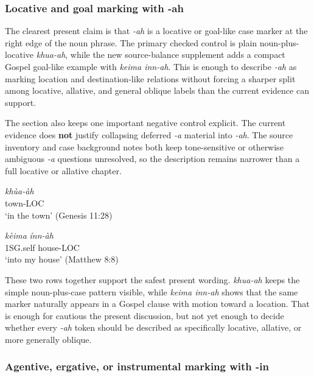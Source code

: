 \documentclass[
  11pt,
  a4paper,
]{article}
\newcommand{\tdim}[1]{\textit{#1}}
\newcommand{\tdimword}[1]{\textit{#1}}
\renewcommand{\textsc}[1]{{\footnotesize\MakeUppercase{#1}}}
\newcommand{\glossquote}[1]{`#1'}
\begin{document}
\subsubsection{Locative and goal marking with
-ah}\label{locative-and-goal-marking-with--ah}

The clearest present claim is that \tdim{-ah} is a locative or goal-like
case marker at the right edge of the noun phrase. The primary checked
control is plain noun-plus-locative \tdim{khua-ah}, while the new
source-balance supplement adds a compact Gospel goal-like example with
\tdim{keima inn-ah}. This is enough to describe \tdim{-ah} as marking
location and destination-like relations without forcing a sharper split
among locative, allative, and general oblique labels than the current
evidence can support.

The section also keeps one important negative control explicit. The
current evidence does \textbf{not} justify collapsing deferred \tdim{-a}
material into \tdim{-ah}. The source inventory and case background notes
both keep tone-sensitive or otherwise ambiguous \tdim{-a} questions
unresolved, so the description remains narrower than a full locative or
allative chapter.

\begin{exe}
\ex \label{ex:case-ah-khua}
\gll \tdimword{khùa-àh} \\
     town-\textsc{loc} \\
\glt \glossquote{in the town} (Genesis 11:28)
\end{exe}

\begin{exe}
\ex \label{ex:case-ah-inn}
\gll \tdimword{kèima} \tdimword{ínn-àh} \\
     \textsc{1sg}.self house-\textsc{loc} \\
\glt \glossquote{into my house} (Matthew 8:8)
\end{exe}

These two rows together support the safest present wording.
\tdim{khua-ah} keeps the simple noun-plus-case pattern visible, while
\tdim{keima inn-ah} shows that the same marker naturally appears in a
Gospel clause with motion toward a location. That is enough for cautious
the present discussion, but not yet enough to decide whether every
\tdim{-ah} token should be described as specifically locative, allative,
or more generally oblique.

\subsubsection{Agentive, ergative, or instrumental marking with
-in}\label{agentive-ergative-or-instrumental-marking-with--in}
\end{document}
